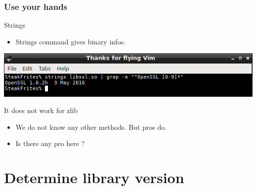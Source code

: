 \documentclass[11pt]{beamer}
\begin{document}
\begin{frame}
    \frametitle{Use your hands} 
    \begin{block}{Strings}
    	\begin{itemize}
    		\item Strings command gives binary infos.
    	\end{itemize}

    \end{block}
    \vspace{1em}
    \includegraphics[scale=0.5]{strings.png}
    \vspace{1em}
    \begin{block}{It does not work for zlib}
    	\begin{itemize}
    		\item We do not know any other methods. But pros do.
    		\item Is there any pro here ?
    		
    	\end{itemize}

    \end{block}
     
\end{frame}

\section{Determine library version}
\end{document}

